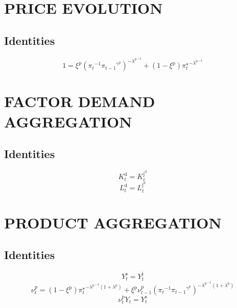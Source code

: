 \section{PRICE EVOLUTION}

\subsection{Identities}

\begin{equation}
1 = {\xi^{\mathrm{p}}} {\left({\pi_{t}}^{-1} {{\pi_{t-1}}^{\gamma^{\mathrm{p}}}}\right)^{-{\lambda^{\mathrm{p}}}^{-1}}} + \left(1 - \xi^{\mathrm{p}}\right) {{\pi^{\star}_{t}}^{-{\lambda^{\mathrm{p}}}^{-1}}}
\end{equation}




\section{FACTOR DEMAND AGGREGATION}

\subsection{Identities}

\begin{equation}
K^{\mathrm{d}}_{t} = K^{\mathrm{j}^{\mathrm{d}}}_{t}
\end{equation}
\begin{equation}
L^{\mathrm{d}}_{t} = L^{\mathrm{j}^{\mathrm{d}}}_{t}
\end{equation}




\section{PRODUCT AGGREGATION}

\subsection{Identities}

\begin{equation}
Y^{\mathrm{s}}_{t} = Y^{\mathrm{j}}_{t}
\end{equation}
\begin{equation}
\nu^{\mathrm{p}}_{t} = \left(1 - \xi^{\mathrm{p}}\right) {{\pi^{\star}_{t}}^{-{\lambda^{\mathrm{p}}}^{-1} \left(1 + \lambda^{\mathrm{p}}\right)}} + {\xi^{\mathrm{p}}} {\nu^{\mathrm{p}}_{t-1}} {\left({\pi_{t}}^{-1} {{\pi_{t-1}}^{\gamma^{\mathrm{p}}}}\right)^{-{\lambda^{\mathrm{p}}}^{-1} \left(1 + \lambda^{\mathrm{p}}\right)}}
\end{equation}
\begin{equation}
{\nu^{\mathrm{p}}_{t}} {Y_{t}} = Y^{\mathrm{s}}_{t}
\end{equation}




